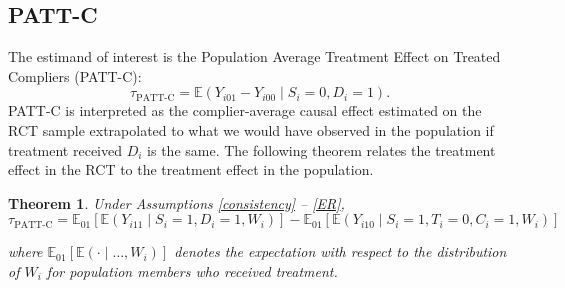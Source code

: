 \documentclass[hidelinks,12pt]{article}
\newtheorem{theorem}{Theorem}
\newcommand{\ex}{\mathbb{E}} %
\begin{document}
\subsection{PATT-C}

The estimand of interest is the Population Average Treatment Effect on Treated Compliers (PATT-C):
%
\begin{equation}\label{tpattc}
\tau_{\text{PATT-C}} = \ex\left( Y_{i01} - Y_{i00} \mid S_i=0, D_i=1\right).
\end{equation}
%
PATT-C is interpreted as the complier-average causal effect estimated on the RCT sample extrapolated to what we would have observed in the population if treatment received $D_i$ is the same. The following theorem relates the treatment effect in the RCT to the treatment effect in the population. 

\vskip 0.2in
\begin{theorem}\label{thm1}
Under Assumptions \eqref{consistency} -- \eqref{ER},
\begin{equation}\label{tpattc-est}
\tau_{\text{PATT-C}} = \ex_{01}\left[  \ex\left(Y_{i11} \mid S_i=1, D_i=1, W_i\right)\right]
-\ex_{01}\left[  \ex\left(Y_{i10} \mid S_i=1, T_i =0, C_i =1, W_i\right) \right] 
\end{equation}

where $\ex_{01}\left[\ex(\cdot \mid\dots, W_i)\right]$ denotes the expectation with respect to the distribution of $W_i$ for population members who received treatment.
\end{theorem}
\end{document}
